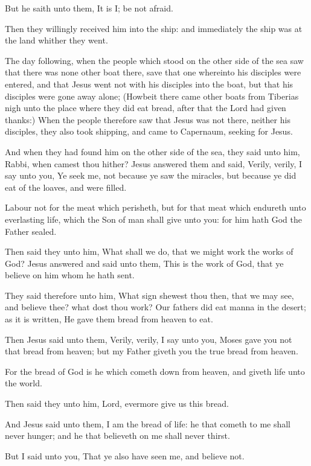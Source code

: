 \verse But he saith unto them, It is I; be not afraid.

\verse Then they willingly received him into the ship: and immediately the ship was at the land whither they went.

\verse The day following, when the people which stood on the other side of the sea saw that there was none other boat there, save that one whereinto his disciples were entered, and that Jesus went not with his disciples into the boat, but that his disciples were gone away alone; \verse (Howbeit there came other boats from Tiberias nigh unto the place where they did eat bread, after that the Lord had given thanks:) \verse When the people therefore saw that Jesus was not there, neither his disciples, they also took shipping, and came to Capernaum, seeking for Jesus.

\verse And when they had found him on the other side of the sea, they said unto him, Rabbi, when camest thou hither?  \verse Jesus answered them and said, Verily, verily, I say unto you, Ye seek me, not because ye saw the miracles, but because ye did eat of the loaves, and were filled.

\verse Labour not for the meat which perisheth, but for that meat which endureth unto everlasting life, which the Son of man shall give unto you: for him hath God the Father sealed.

\verse Then said they unto him, What shall we do, that we might work the works of God?  \verse Jesus answered and said unto them, This is the work of God, that ye believe on him whom he hath sent.

\verse They said therefore unto him, What sign shewest thou then, that we may see, and believe thee? what dost thou work?  \verse Our fathers did eat manna in the desert; as it is written, He gave them bread from heaven to eat.

\verse Then Jesus said unto them, Verily, verily, I say unto you, Moses gave you not that bread from heaven; but my Father giveth you the true bread from heaven.

\verse For the bread of God is he which cometh down from heaven, and giveth life unto the world.

\verse Then said they unto him, Lord, evermore give us this bread.

\verse And Jesus said unto them, I am the bread of life: he that cometh to me shall never hunger; and he that believeth on me shall never thirst.

\verse But I said unto you, That ye also have seen me, and believe not.

